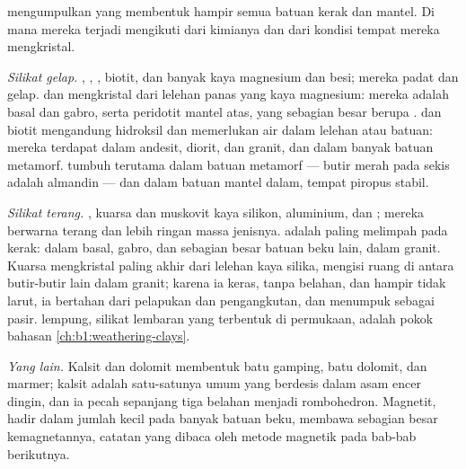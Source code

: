  mengumpulkan  yang membentuk hampir semua batuan kerak dan mantel. Di mana mereka terjadi mengikuti dari kimianya dan dari kondisi tempat mereka mengkristal.

\emph{Silikat gelap.} , , , biotit, dan banyak  kaya magnesium dan besi; mereka padat dan gelap.  dan  mengkristal dari lelehan panas yang kaya magnesium: mereka adalah  basal dan gabro, serta peridotit mantel atas, yang sebagian besar berupa .  dan biotit mengandung hidroksil dan memerlukan air dalam lelehan atau batuan: mereka terdapat dalam andesit, diorit, dan granit, dan dalam banyak batuan metamorf.  tumbuh terutama dalam batuan metamorf --- butir merah pada sekis  adalah almandin --- dan dalam batuan mantel dalam, tempat piropus stabil.

\emph{Silikat terang.} , kuarsa dan muskovit kaya silikon, aluminium, dan ; mereka berwarna terang dan lebih ringan massa jenisnya.  adalah  paling melimpah pada kerak:  dalam basal, gabro, dan sebagian besar batuan beku lain,  dalam granit. Kuarsa mengkristal paling akhir dari lelehan kaya silika, mengisi ruang di antara butir-butir lain dalam granit; karena ia keras, tanpa belahan, dan hampir tidak larut, ia bertahan dari pelapukan dan pengangkutan, dan menumpuk sebagai pasir.  lempung, silikat lembaran yang terbentuk di permukaan, adalah pokok bahasan \cref{ch:b1:weathering-clays}.

\emph{Yang lain.} Kalsit dan dolomit membentuk batu gamping, batu dolomit, dan marmer; kalsit adalah satu-satunya  umum yang berdesis dalam asam encer dingin, dan ia pecah sepanjang tiga belahan menjadi rombohedron. Magnetit, hadir dalam jumlah kecil pada banyak batuan beku, membawa sebagian besar kemagnetannya, catatan yang dibaca oleh metode magnetik pada bab-bab berikutnya.


